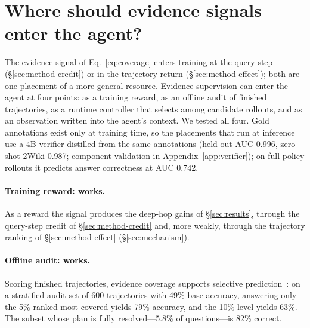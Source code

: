 
\section{Where should evidence signals enter the agent?}
\label{sec:placement}

The evidence signal of Eq.~\ref{eq:coverage} enters training at the
query step (\S\ref{sec:method-credit}) or in the trajectory return
(\S\ref{sec:method-effect}); both are one placement of a more general
resource. Evidence supervision can enter the agent at four
points: as a training reward, as an offline audit of finished
trajectories, as a runtime controller that selects among candidate
rollouts, and as an observation written into the agent's context. We
tested all four. Gold annotations exist only at training time, so the
placements that run at inference use a 4B verifier distilled from the
same annotations (held-out AUC 0.996, zero-shot 2Wiki 0.987; component
validation in Appendix~\ref{app:verifier}); on full policy rollouts it predicts answer
correctness at AUC 0.742.

\paragraph{Training reward: works.} As a reward the signal produces
the deep-hop gains of \S\ref{sec:results}, through the query-step
credit of \S\ref{sec:method-credit} and, more weakly, through the
trajectory ranking of \S\ref{sec:method-effect}
(\S\ref{sec:mechanism}).

\paragraph{Offline audit: works.} Scoring finished trajectories,
evidence coverage supports selective
prediction~\citep{geifman2017selective}: on a stratified audit set of
600 trajectories with 49\% base accuracy, answering only the 5\%
ranked most-covered yields 79\% accuracy, and the 10\% level yields
63\%. The subset whose plan is fully resolved---5.8\% of
questions---is 82\% correct.

